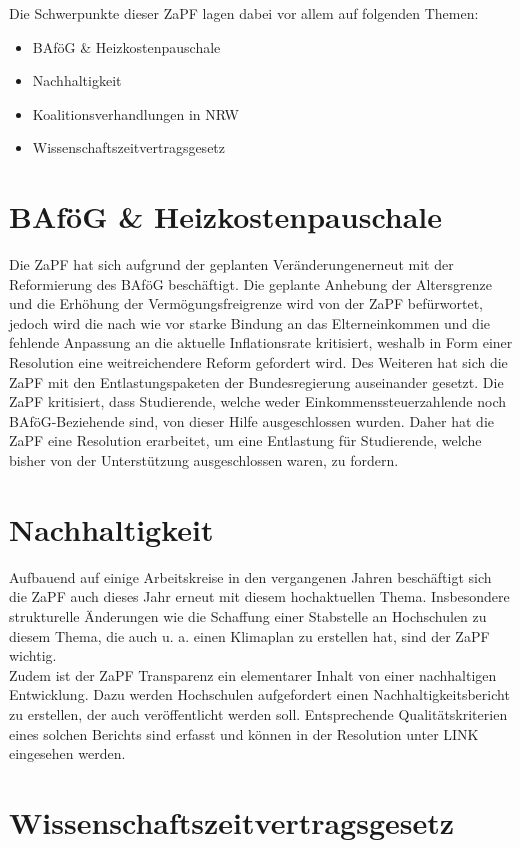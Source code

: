 \documentclass{scrartcl}
\begin{document}
Die Schwerpunkte dieser ZaPF lagen dabei vor allem auf folgenden Themen:
\begin{itemize}
\item BAföG \& Heizkostenpauschale
\item Nachhaltigkeit
\item Koalitionsverhandlungen in NRW
\item Wissenschaftszeitvertragsgesetz
\end{itemize}

\section*{BAföG \& Heizkostenpauschale}
Die ZaPF hat sich aufgrund der geplanten Veränderungenerneut mit der Reformierung des BAföG beschäftigt. Die geplante Anhebung der Altersgrenze und die Erhöhung der Vermögungsfreigrenze wird von der ZaPF befürwortet, jedoch wird die nach wie vor starke Bindung an das Elterneinkommen und die fehlende Anpassung an die aktuelle Inflationsrate kritisiert, weshalb in Form einer Resolution eine weitreichendere Reform gefordert wird.
Des Weiteren hat sich die ZaPF mit den Entlastungspaketen der Bundesregierung auseinander gesetzt. Die ZaPF kritisiert, dass Studierende, welche weder  Einkommenssteuerzahlende noch BAföG-Beziehende sind, von dieser Hilfe ausgeschlossen wurden. Daher hat die ZaPF eine Resolution erarbeitet, um eine Entlastung für Studierende, welche bisher von der Unterstützung ausgeschlossen waren, zu fordern.

\section*{Nachhaltigkeit}
Aufbauend auf einige Arbeitskreise in den vergangenen Jahren beschäftigt sich die ZaPF auch dieses Jahr erneut mit diesem hochaktuellen Thema. Insbesondere strukturelle Änderungen wie die Schaffung einer Stabstelle an Hochschulen zu diesem Thema, die auch u. a. einen Klimaplan zu erstellen hat, sind der ZaPF wichtig.\\
Zudem ist der ZaPF Transparenz ein elementarer Inhalt von einer nachhaltigen Entwicklung. Dazu werden Hochschulen aufgefordert einen Nachhaltigkeitsbericht zu erstellen, der auch veröffentlicht werden soll. Entsprechende Qualitätskriterien eines solchen Berichts sind erfasst und können in der Resolution unter LINK eingesehen werden.


\section*{Wissenschaftszeitvertragsgesetz}
\end{document}
